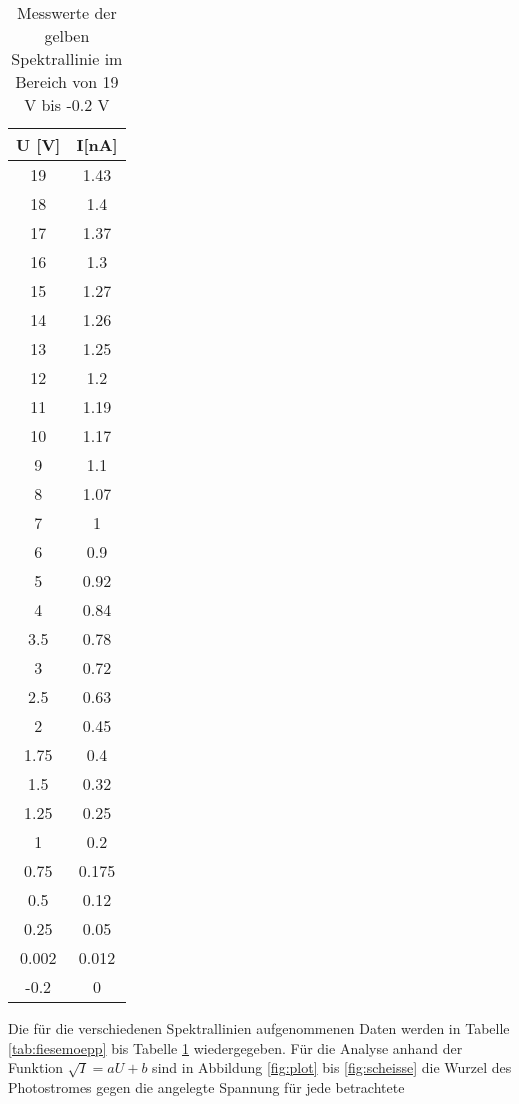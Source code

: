   \begin{table}[H]
    \centering
    \caption{Messwerte der gelben Spektrallinie im Bereich von 19 V bis -0.2 V}
    \label{tab:idle}
    \begin{tabular}{c c}
     \toprule
      U [V]& I[nA]\\
      \midrule
       19     & 1.43  \\
       18     & 1.4   \\
       17     & 1.37  \\
       16     & 1.3   \\
       15     & 1.27  \\
       14     & 1.26  \\
       13     & 1.25  \\
       12     & 1.2   \\
       11     & 1.19  \\
       10     & 1.17  \\
        9     & 1.1   \\
        8     & 1.07  \\
        7     & 1     \\
        6     & 0.9   \\
        5     & 0.92  \\
        4     & 0.84  \\
        3.5   & 0.78  \\
        3     & 0.72  \\
        2.5   & 0.63  \\
        2     & 0.45  \\
        1.75  & 0.4   \\
        1.5   & 0.32  \\
        1.25  & 0.25  \\
        1     & 0.2   \\
        0.75  & 0.175 \\
        0.5   & 0.12  \\
        0.25  & 0.05  \\
        0.002 & 0.012 \\
       -0.2   & 0     \\
     \bottomrule
    \end{tabular}
  \end{table} 
  \noindent Die für die verschiedenen Spektrallinien aufgenommenen Daten werden
  in Tabelle \ref{tab:fiesemoepp} bis Tabelle \ref{tab:idle} wiedergegeben.
  Für die Analyse anhand der Funktion $\sqrt{I}=aU+b$ sind in Abbildung \ref{fig:plot} 
  bis \ref{fig:scheisse} die Wurzel des Photostromes gegen die angelegte Spannung für jede betrachtete
